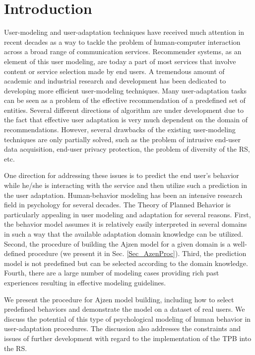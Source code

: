 \documentclass{llncs}
\begin{document}
\section{Introduction}\label{Sec_Intro} 

User-modeling and user-adaptation techniques have received much attention in recent decades as a way to tackle the problem of human-computer interaction across a broad range of communication services. Recommender systems, as an element of this user modeling, are today a part of most services that involve content or service selection made by end users. A tremendous amount of academic and industrial research and development has been dedicated to developing more efficient user-modeling techniques. Many user-adaptation tasks can be seen as a problem of the effective recommendation of a predefined set of entities. Several different directions of algorithm are under development due to the fact that effective user adaptation is very much dependent on the domain of recommendations. However, several drawbacks of the existing user-modeling techniques are only partially solved, such as the problem of intrusive end-user data acquisition, end-user privacy protection, the problem of diversity of the RS, etc.

One direction for addressing these issues is to predict the end user’s behavior while he/she is interacting with the service and then utilize such a prediction in the user adaptation. Human-behavior modeling has been an intensive research field in psychology for several decades. The Theory of Planned Behavior \cite{AjzenWebPage} is particularly appealing in user modeling and adaptation for several reasons. First, the behavior model assumes it is relatively easily interpreted in several domains in such a way that the available adaptation domain knowledge can be utilized. Second, the procedure of building the Ajzen model for a given domain is a well-defined procedure (we present it in Sec.  \ref{Sec_AzenProc}). Third, the prediction model is not predefined but can be selected according to the domain knowledge. Fourth, there are a large number of modeling cases providing rich past experiences resulting in effective modeling guidelines.

We present the procedure for Ajzen model building, including how to select predefined behaviors and demonstrate the model on a dataset of real users. We discuss the potential of this type of psychological modeling of human behavior in user-adaptation procedures. The discussion also addresses the constraints and issues of further development with regard to the implementation of the TPB into the RS.
\end{document}
